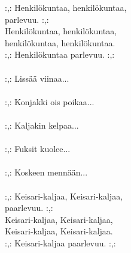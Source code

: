 
            :,: Henkilökuntaa, henkilökuntaa, \\
            parlevuu. :,: \\
            Henkilökuntaa, henkilökuntaa, \\
            henkilökuntaa, henkilökuntaa. \\
            :,: Henkilökuntaa parlevuu. :,: \\
\hspace{10mm} \\
            :,: Lissää viinaa... \\
\hspace{10mm} \\
            :,: Konjakki ois poikaa... \\
\hspace{10mm} \\
            :,: Kaljakin kelpaa... \\
\hspace{10mm} \\
            :,: Fuksit kuolee... \\
\hspace{10mm} \\
            :,: Koskeen mennään... \\
\hspace{10mm} \\
            :,: Keisari-kaljaa, Keisari-kaljaa, \\
            paarlevuu. :,: \\
            Keisari-kaljaa, Keisari-kaljaa, \\
            Keisari-kaljaa, Keisari-kaljaa. \\
            :,: Keisari-kaljaa paarlevuu. :,: \\
